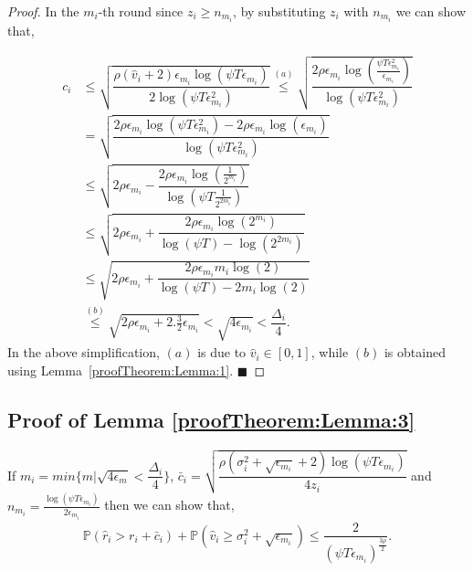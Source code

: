 \begin{proof}

	In the $m_i$-th round since $z_i\geq n_{m_i}$, by substituting $z_i$ with $n_{m_i}$ we can show that, 

\begin{align*}
	c_{i} &\leq \sqrt{\dfrac{\rho (\hat{v}_i + 2)\epsilon_{m_{i}}\log (\psi T\epsilon_{m_{i}})}{2\log(\psi T\epsilon_{m_{i}}^{2})}} \overset{(a)}{\leq} \sqrt{\dfrac{2\rho\epsilon_{m_{i}}\log (\frac{\psi T\epsilon_{m_{i}}^{2}}{\epsilon_{m_{i}}})}{\log(\psi T\epsilon_{m_{i}}^{2})}} \\
	& = \sqrt{\dfrac{2\rho\epsilon_{m_{i}}\log (\psi T\epsilon_{m_{i}}^{2}) - 2\rho\epsilon_{m_{i}}\log (\epsilon_{m_{i}})}{\log(\psi T\epsilon_{m_{i}}^{2})}} \\
	& \leq  \sqrt{2\rho\epsilon_{m_{i}} - \dfrac{2\rho\epsilon_{m_i}\log(\frac{1}{2^{m_i}})}{\log(\psi T \frac{1}{2^{2m_i}})}} \\
	&\leq \sqrt{2\rho\epsilon_{m_{i}} + \dfrac{2\rho\epsilon_{m_i}\log(2^{m_i})}{\log(\psi T) - \log( 2^{2m_i})}}\\
	& \leq \sqrt{2\rho\epsilon_{m_{i}} + \dfrac{2\rho\epsilon_{m_i}m_i \log(2)}{\log(\psi T) - 2m_i\log( 2)}} \\ 
	 & \overset{(b)}{\leq} \sqrt{2\rho\epsilon_{m_{i}} + 2.\frac{3}{2}\epsilon_{m_i}} 
	  < \sqrt{4\epsilon_{m_i}} < \dfrac{\Delta_{i}}{4}.
	\end{align*}
In the above simplification, $(a)$ is due to $\hat{v}_i \in [0,1]$, while $(b)$ is obtained using Lemma~\ref{proofTheorem:Lemma:1}.
\hfill $\blacksquare$	
\end{proof}


\subsection{Proof of Lemma \ref{proofTheorem:Lemma:3}}
\label{App:Lemma:3}
\begin{customlem}{3}
If $m_i = min\lbrace m|\sqrt{4\epsilon_{m} } < \dfrac{\Delta_i}{4} \rbrace $,  $\bar{c}_i=\sqrt{\dfrac{\rho (\sigma_{i}^{2}+\sqrt{\epsilon_{m_{i}}} + 2)\log(\psi T\epsilon_{m_{i}})}{4z_i}}$ and $n_{m_i} = \frac{\log{(\psi T\epsilon_{m_{i}})}}{2\epsilon_{m_{i}}}$ then we can show that,
\begin{align*}
\mathbb{P}\left( \hat{r}_{i} > r_{i}+ \bar{c}_i\right) 
+ \mathbb{P}\left( \hat{v}_{i}\geq \sigma_{i}^{2}+\sqrt{\epsilon_{m_{i}}}\right) \leq \dfrac{2}{(\psi  T\epsilon_{m_{i}})^{\frac{3\rho}{2}}}.
\end{align*}
\end{customlem}

